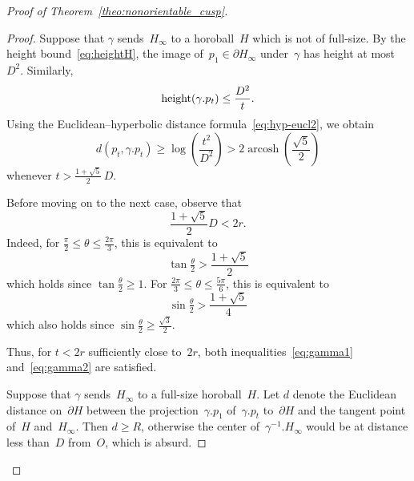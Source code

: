\documentclass[11pt,reqno]{amsart}
\theoremstyle{definition}
\numberwithin{equation}{section}
\DeclareMathOperator{\arcosh}{arcosh}
\DeclareMathOperator{\height}{{\rm height}}
\numberwithin{equation}{section}
\begin{document}
\begin{proof}[Proof of Theorem~\ref{theo:nonorientable_cusp}]
\begin{proof}
\medskip

Suppose that $\gamma$ sends~$H_\infty$ to a horoball~$H$ which is not of full-size.
By the height bound~\eqref{eq:heightH}, the image of~$p_1 \in \partial H_\infty$ under~$\gamma$ has height at most~$D^2$.
Similarly,
\[
\height(\gamma.p_t) \leq \frac{D^2}{t}.
\]
Using the Euclidean--hyperbolic distance formula~\eqref{eq:hyp-eucl2}, we obtain
\begin{equation} \label{eq:gamma2}
d(p_t,\gamma.p_t) \geq \log \left( \frac{t^2}{D^2} \right) > 2 \arcosh \left( \frac{\sqrt{5}}{2} \right)
\end{equation}
whenever $t > \frac{1+\sqrt{5}}{2} \, D$.

\medskip

Before moving on to the next case, observe that 
\[
\frac{1+\sqrt{5}}{2} D < 2r.
\]
Indeed, for $\frac{\pi}{2} \leq \theta \leq \frac{2\pi}{3}$, this is equivalent to
\[
\tan \tfrac{\theta}{2} > \frac{1+\sqrt{5}}{2}
\]
which holds since $\tan \frac{\theta}{2} \geq 1$.
For $\frac{2\pi}{3} \leq \theta \leq \frac{5\pi}{6}$, this is equivalent to
\[
\sin \tfrac{\theta}{2} > \frac{1+\sqrt{5}}{4}
\]
which also holds since $\sin \frac{\theta}{2} \geq \frac{\sqrt{3}}{2}$.

Thus, for $t<2r$ sufficiently close to~$2r$, both inequalities~\eqref{eq:gamma1} and~\eqref{eq:gamma2} are satisfied.

\medskip

Suppose that $\gamma$ sends~$H_\infty$ to a full-size horoball~$H$.
Let $d$ denote the Euclidean distance on~$\partial H$ between the projection~$\gamma.p_1$ of~$\gamma.p_t$ to~$\partial H$ and the tangent point of~$H$ and~$H_\infty$.
Then $d \geq R$, otherwise the center of~$\gamma^{-1}.H_\infty$ would be at distance less than~$D$ from~$O$, which is absurd.


\end{proof}
\end{proof}
\end{document}
